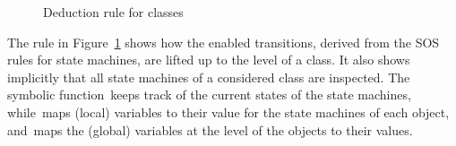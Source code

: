 \begin{figure}[hbt]
\centering
{}
\caption{Deduction rule for classes}
\label{fig:reusable-correct-transformations:classes}
\end{figure}

The rule in Figure~\ref{fig:reusable-correct-transformations:classes} shows how the enabled transitions, derived from the SOS rules for state machines, are lifted up to the level of a class.
It also shows implicitly that all state machines of a considered class are inspected.
The symbolic function~\ssms keeps track of the current states of the state machines, while~\vsms maps (local) variables to their value for the state machines of each object, and~\vvars maps the (global) variables at the level of the objects to their values.

